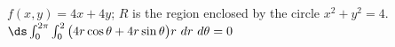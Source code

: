 {$f(x,y) = 4x+4y$; $R$ is the region enclosed by the circle $x^2+y^2=4$.
}
{$\ds \int_0^{2\pi}\int_0^2 \big(4r\cos\theta+4r\sin\theta\big)r\ dr\ d\theta = 0$
}